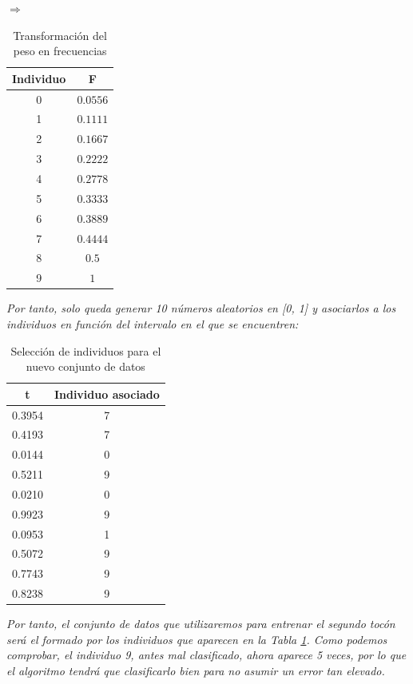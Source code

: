 \documentclass[12pt,twoside]{article}
\begin{document}
\begin{table}[h]
\centering
$\Rightarrow$
\begin{tabular}{|c|c|}
\hline
Individuo & F \\ \hline
0 & $0.0556$ \\ \hline
1 & $0.1111$ \\ \hline
2 & $0.1667$ \\ \hline
3 & $0.2222$ \\ \hline
4 & $0.2778$ \\ \hline
5 & $0.3333$ \\ \hline
6 & $0.3889$ \\ \hline
7 & $0.4444$ \\ \hline
8 & $0.5$ \\ \hline
9 & $1$ \\ \hline
\end{tabular}
\caption{Transformación del peso en frecuencias}
\end{table}
\textit{Por tanto, solo queda generar 10 números aleatorios en [0, 1] y asociarlos a los individuos en función del intervalo en el que se encuentren: }
\begin{table}[h]
\centering
\begin{tabular}{|c|c|}
\hline
t & Individuo asociado \\ \hline
0.3954 & 7 \\ \hline
0.4193 & 7 \\ \hline
0.0144 & 0 \\ \hline
0.5211 & 9 \\ \hline
0.0210 & 0 \\ \hline
0.9923 & 9 \\ \hline
0.0953 & 1 \\ \hline
0.5072 & 9 \\ \hline
0.7743 & 9 \\ \hline
0.8238 & 9 \\ \hline
\end{tabular}
\caption{Selección de individuos para el nuevo conjunto de datos}
\label{tab:AdaB_selec}
\end{table}
\textit{Por tanto, el conjunto de datos que utilizaremos para entrenar el segundo tocón será el formado por los individuos que aparecen en la Tabla \ref{tab:AdaB_selec}. Como podemos comprobar, el individuo 9, antes mal clasificado, ahora aparece 5 veces, por lo que el algoritmo tendrá que clasificarlo bien para no asumir un error tan elevado.}

\newpage

\bigskip \bigskip \bigskip \bigskip \bigskip
\end{document}
